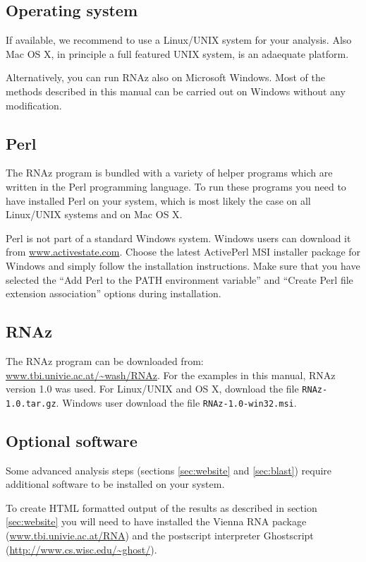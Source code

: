 \documentclass[11pt]{article}
\begin{document}
\subsection{Operating system}

If available, we recommend to use a Linux/UNIX system for your analysis.
Also Mac OS X, in principle a full featured UNIX system, is an adaequate
platform.

Alternatively, you can run RNAz also on Microsoft Windows.  Most of the
methods described in this manual can be carried out on Windows without any
modification.


\subsection{Perl}
\label{sec:perl}

The RNAz program is bundled with a variety of helper programs
which are written in the Perl programming language. To run these programs
you need to have installed Perl on your system, which is most likely the
case on all Linux/UNIX systems and on Mac OS X.
 
Perl is not part of a standard Windows system. Windows users can download it
from \url{www.activestate.com}. Choose the latest ActivePerl MSI installer
package for Windows and simply follow the installation instructions. Make
sure that you have selected the ``Add Perl to the PATH environment
variable'' and ``Create Perl file extension association'' options during
installation.

\subsection{RNAz}

The RNAz program can be downloaded from:
\url{www.tbi.univie.ac.at/~wash/RNAz}. For the examples in this manual,
RNAz version 1.0 was used. For Linux/UNIX and OS X, download the file
\texttt{RNAz-1.0.tar.gz}. Windows user download the file
\texttt{RNAz-1.0-win32.msi}.

\subsection{Optional software}
\label{sec:optional-software}

Some advanced analysis steps (sections \ref{sec:website} and
\ref{sec:blast}) require additional software to be installed on your
system.

To create HTML formatted output of the results as described in section
\ref{sec:website} you will need to have installed the Vienna RNA package
(\url{www.tbi.univie.ac.at/RNA}) and the postscript interpreter Ghostscript
(\url{http://www.cs.wisc.edu/~ghost/}).
\end{document}
